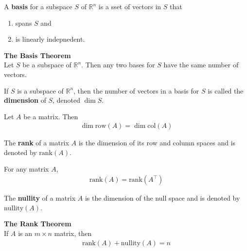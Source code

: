 \documentclass{article}
\begin{document}
\begin{definition}
	A \textbf{basis} for a subspace $S$ of $\mathbb{R}^n$ is a sset of vectors in $S$ that
	\begin{enumerate}
		\item spans $S$ and
		\item is linearly indepnedent.
	\end{enumerate}
\end{definition}
\begin{theorem}
	\textbf{The Basis Theorem}\\
	Let $S$ be a subspace of $\mathbb{R}^n$. Then any two bases for $S$ have the same number of vectors.
\end{theorem}
\begin{definition}
	If $S$ is a subspace of $\mathbb{R}^n$, then the number of vectors in a basis for $S$ is called the \textbf{dimension} of $S$, denoted $\dim S$.
\end{definition}
\begin{theorem}
	Let $A$ be a matrix. Then
	\begin{gather*}
		\dim \text{row}(A) = \dim \text{col}(A)
	\end{gather*}
\end{theorem}
\begin{definition}
	The \textbf{rank} of a matrix $A$ is the dimension of its row and column spaces and is denoted by $\text{rank}(A)$.
\end{definition}
\begin{theorem}
	For any matrix $A$,
	\begin{gather*}
		\text{rank}(A) = \text{rank}(A^\intercal)
	\end{gather*}
\end{theorem}
\begin{definition}
	The \textbf{nullity} of a matrix $A$ is the dimension of the null space and is denoted by $\text{nullity}(A)$.
\end{definition}
\begin{theorem}
	\textbf{The Rank Theorem}\\
	If $A$ is an $m\times n$ matrix, then
	\begin{gather*}
		\text{rank}(A) + \text{nullity}(A) = n
	\end{gather*}
\end{theorem}
\end{document}
